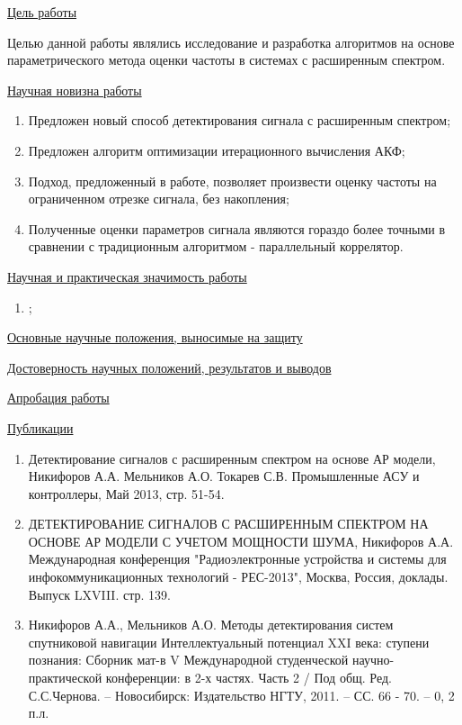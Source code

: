 \underline{Цель работы}

Целью данной работы являлись исследование и разработка алгоритмов на основе параметрического метода оценки частоты в системах 
с расширенным спектром.

\underline{Научная новизна работы}
\begin{enumerate}
      \item {Предложен новый способ детектирования сигнала с расширенным спектром;}
      \item {Предложен алгоритм оптимизации итерационного вычисления АКФ;}
      \item {Подход, предложенный в работе, позволяет произвести оценку частоты на ограниченном отрезке сигнала, без накопления;}
      \item {Полученные оценки параметров сигнала являются гораздо более точными в сравнении с традиционным алгоритмом - 
      		параллельный коррелятор.}
\end{enumerate}

\underline{Научная и практическая значимость работы}
\begin{enumerate}
      \item {;}
\end{enumerate}

\underline{Основные научные положения, выносимые на защиту}

\underline{Достоверность научных положений, результатов и выводов}

\underline{Апробация работы}

\underline{Публикации}
\begin{enumerate}
	\item Детектирование сигналов с расширенным спектром на основе АР модели, Никифоров А.А. Мельников А.О. Токарев С.В. Промышленные АСУ и контроллеры, Май 2013, стр. 51-54.
	\item ДЕТЕКТИРОВАНИЕ СИГНАЛОВ С РАСШИРЕННЫМ СПЕКТРОМ НА ОСНОВЕ АР МОДЕЛИ С УЧЕТОМ МОЩНОСТИ ШУМА, Никифоров А.А. Международная конференция
		"Радиоэлектронные устройства и системы для инфокоммуникационных технологий - РЕС-2013", Москва, Россия, доклады. Выпуск LXVIII. стр. 139.
	\item Никифоров А.А., Мельников А.О. Методы детектирования систем спутниковой навигации Интеллектуальный потенциал XXI века: ступени познания:
		Сборник мат-в V Международной студенческой научно-практической конференции: в 2-х частях. Часть 2 / Под общ. Ред. С.С.Чернова. – Новосибирск:
		Издательство НГТУ, 2011. – СС. 66 - 70. – 0, 2 п.л.
\end{enumerate}

